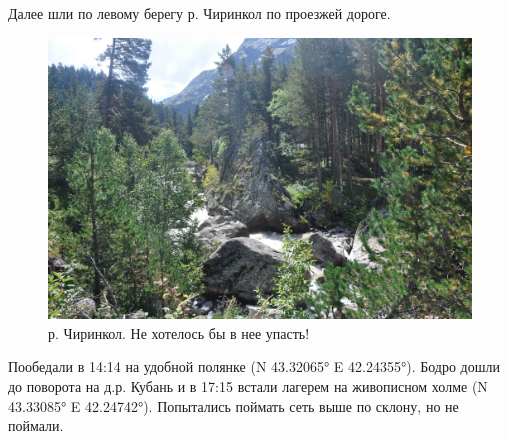 Далее шли по левому берегу р. Чиринкол по проезжей дороге. 
\begin{figure}[h!]
	\centering
	\includegraphics[width=0.7\linewidth]{../pics/DSC_0461 2}
	\caption{р. Чиринкол. Не хотелось бы в нее упасть!}
	\label{fig:DSC_0461}
\end{figure}
Пообедали в 14:14 на удобной полянке (N 43.32065° E 42.24355°). Бодро дошли до поворота на д.р. Кубань и в 17:15 встали лагерем на живописном холме (N 43.33085° E 42.24742°). Попытались поймать сеть выше по склону, но не поймали.

\clearpage